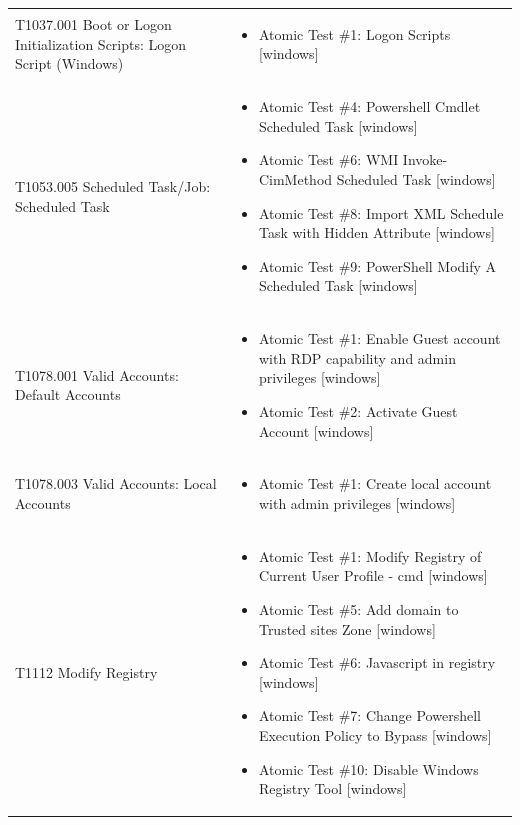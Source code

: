 \begin{longtable}{p{} p{}}
T1037.001 Boot or Logon Initialization Scripts: Logon Script (Windows) & \begin{itemize}[leftmargin=*, nosep, topsep=0pt]
  \item Atomic Test \#1: Logon Scripts [windows]
\end{itemize} \\ [1.5ex]
T1053.005 Scheduled Task/Job: Scheduled Task & \begin{itemize}[leftmargin=*, nosep, topsep=0pt]
  \item Atomic Test \#4: Powershell Cmdlet Scheduled Task [windows]
  \item Atomic Test \#6: WMI Invoke-CimMethod Scheduled Task [windows]
  \item Atomic Test \#8: Import XML Schedule Task with Hidden Attribute [windows]
  \item Atomic Test \#9: PowerShell Modify A Scheduled Task [windows]
\end{itemize} \\ [1.5ex]
T1078.001 Valid Accounts: Default Accounts & \begin{itemize}[leftmargin=*, nosep, topsep=0pt]
  \item Atomic Test \#1: Enable Guest account with RDP capability and admin privileges [windows]
  \item Atomic Test \#2: Activate Guest Account [windows]
\end{itemize} \\ [1.5ex]
T1078.003 Valid Accounts: Local Accounts & \begin{itemize}[leftmargin=*, nosep, topsep=0pt]
  \item Atomic Test \#1: Create local account with admin privileges [windows]
\end{itemize} \\ [1.5ex]
T1112 Modify Registry & \begin{itemize}[leftmargin=*, nosep, topsep=0pt]
  \item Atomic Test \#1: Modify Registry of Current User Profile - cmd [windows]
  \item Atomic Test \#5: Add domain to Trusted sites Zone [windows]
  \item Atomic Test \#6: Javascript in registry [windows]
  \item Atomic Test \#7: Change Powershell Execution Policy to Bypass [windows]
  \item Atomic Test \#10: Disable Windows Registry Tool [windows]

\end{itemize}
\end{longtable}
